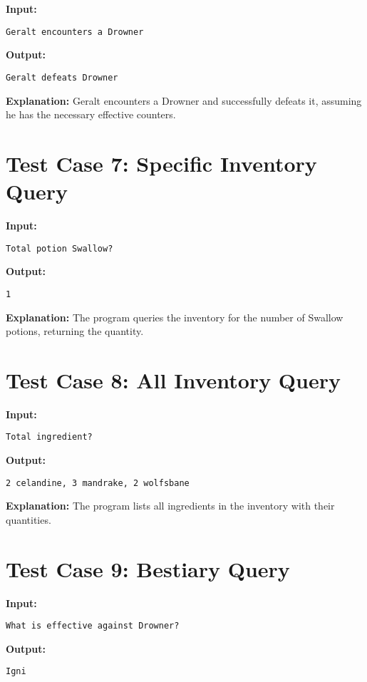 \documentclass{article}
\begin{document}
\textbf{Input:}
\begin{lstlisting}
Geralt encounters a Drowner
\end{lstlisting}

\textbf{Output:}
\begin{lstlisting}
Geralt defeats Drowner
\end{lstlisting}

\textbf{Explanation:} Geralt encounters a Drowner and successfully defeats it, assuming he has the necessary effective counters.

\section*{Test Case 7: Specific Inventory Query}

\textbf{Input:}
\begin{lstlisting}
Total potion Swallow?
\end{lstlisting}

\textbf{Output:}
\begin{lstlisting}
1
\end{lstlisting}

\textbf{Explanation:} The program queries the inventory for the number of Swallow potions, returning the quantity.

\section*{Test Case 8: All Inventory Query}

\textbf{Input:}
\begin{lstlisting}
Total ingredient?
\end{lstlisting}

\textbf{Output:}
\begin{lstlisting}
2 celandine, 3 mandrake, 2 wolfsbane
\end{lstlisting}

\textbf{Explanation:} The program lists all ingredients in the inventory with their quantities.

\section*{Test Case 9: Bestiary Query}

\textbf{Input:}
\begin{lstlisting}
What is effective against Drowner?
\end{lstlisting}

\textbf{Output:}
\begin{lstlisting}
Igni
\end{lstlisting}
\end{document}
